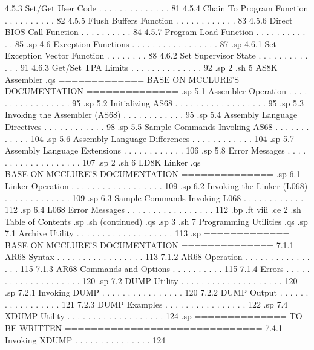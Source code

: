         4.5.3  Set/Get User Code  . . . . . . . . . . . . . .  81 
        4.5.4  Chain To Program Function  . . . . . . . . . .  82 
        4.5.5  Flush Buffers Function . . . . . . . . . . . .  83 
        4.5.6  Direct BIOS Call Function  . . . . . . . . . .  84 
        4.5.7  Program Load Function  . . . . . . . . . . . .  85 
.sp
   4.6  Exception Functions . . . . . . . . . . . . . . . . .  87 
.sp
        4.6.1  Set Exception Vector Function  . . . . . . . .  88 
        4.6.2  Set Supervisor State . . . . . . . . . . . . .  91 
        4.6.3  Get/Set TPA Limits . . . . . . . . . . . . . .  92 
.sp 2
.sh
5  AS8K Assembler 
.qs
============= BASE ON MCCLURE'S DOCUMENTATION ==============
.sp
   5.1  Assembler Operation . . . . . . . . . . . . . . . . .  95
.sp
   5.2  Initializing AS68 . . . . . . . . . . . . . . . . . .  95
.sp
   5.3  Invoking the Assembler (AS68) . . . . . . . . . . . .  95
.sp
   5.4  Assembly Language Directives  . . . . . . . . . . . .  98
.sp
   5.5  Sample Commands Invoking AS68 . . . . . . . . . . . . 104
.sp
   5.6  Assembly Language Differences . . . . . . . . . . . . 104
.sp
   5.7  Assembly Language Extensions  . . . . . . . . . . . . 106
.sp
   5.8  Error Messages  . . . . . . . . . . . . . . . . . . . 107
.sp 2
.sh
6  LD8K Linker  
.qs
============= BASE ON MCCLURE'S DOCUMENTATION ==============
.sp
   6.1  Linker Operation  . . . . . . . . . . . . . . . . . . 109
.sp
   6.2  Invoking the Linker (L068)  . . . . . . . . . . . . . 109
.sp
   6.3  Sample Commands Invoking L068 . . . . . . . . . . . . 112
.sp
   6.4  L068 Error Messages . . . . . . . . . . . . . . . . . 112
.bp
.ft                                viii
.ce 2
.sh
Table of Contents
.sp
.sh
(continued)
.qs
.sp 3
.sh
7  Programming Utilities
.qs
.sp  
   7.1  Archive Utility . . . . . . . . . . . . . . . . . . . 113
.sp
============= BASE ON MCCLURE'S DOCUMENTATION ==============
        7.1.1  AR68 Syntax  . . . . . . . . . . . . . . . . . 113
        7.1.2  AR68 Operation . . . . . . . . . . . . . . . . 115 
        7.1.3  AR68 Commands and Options  . . . . . . . . . . 115 
        7.1.4  Errors . . . . . . . . . . . . . . . . . . . . 120 
.sp
   7.2  DUMP Utility  . . . . . . . . . . . . . . . . . . . . 120
.sp
        7.2.1  Invoking DUMP  . . . . . . . . . . . . . . . . 120
        7.2.2  DUMP Output  . . . . . . . . . . . . . . . . . 121 
        7.2.3  DUMP Examples  . . . . . . . . . . . . . . . . 122 
.sp
   7.4  XDUMP Utility   . . . . . . . . . . . . . . . . . . . 124
.sp
============== TO BE WRITTEN ==============================
        7.4.1  Invoking XDUMP   . . . . . . . . . . . . . . . 124

